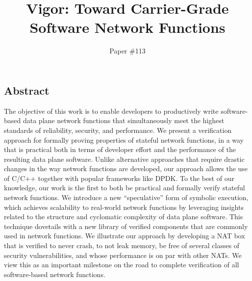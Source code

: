 \documentclass[letterpaper,twocolumn,10pt]{article}
\begin{document}
\date{}

\title{\Large \bf Vigor: Toward Carrier-Grade Software Network Functions}

\author{
    {\rm Paper \#113}\\
}

\maketitle

\thispagestyle{empty}


\subsection*{Abstract}
The objective of this work is to enable developers to productively write
software-based data plane network functions that simultaneously meet the highest
standards of reliability, security, and performance. We present a verification
approach for formally proving properties of stateful network functions, in a way
that is practical both in terms of developer effort and the performance of the
resulting data plane software. Unlike alternative approaches that require
drastic changes in the way network functions are developed, our approach allows
the use of C/C++ together with popular frameworks like DPDK. To the best of our
knowledge, our work is the first to both be practical and formally verify
stateful network functions. We introduce a new ``speculative'' form of symbolic
execution, which achieves scalability to real-world network functions by
leveraging insights related to the structure and cyclomatic complexity of data
plane software. This technique dovetails with a new library of verified
components that are commonly used in network functions. We illustrate our
approach by developing a NAT box that is verified to never crash, to not leak
memory, be free of several classes of security vulnerabilities, and whose
performance is on par with other NATs.
We view this as an important milestone on the road to complete verification of all software-based network functions.
\end{document}
